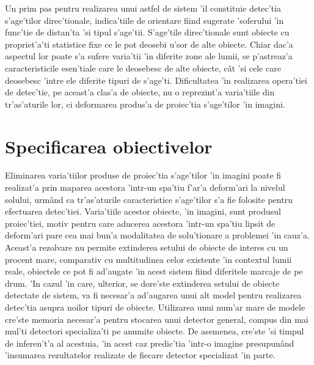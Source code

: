 \documentclass[12pt,a4paper,twoside]{report}
\begin{document}
Un prim pas pentru realizarea unui astfel de sistem 'il constituie detec'tia s'age'tilor direc'tionale, indica'tiile de orientare fiind sugerate 'soferului 'in func'tie de distan'ta 'si tipul s'age'tii. S'age'tile direc'tionale sunt obiecte cu propriet'a'ti statistice fixe ce le pot deosebi u'sor de alte obiecte. Chiar dac'a aspectul lor poate s'a sufere varia'tii 'in diferite zone ale lumii, se p'astreaz'a caracteristicile esen'tiale care le deosebesc de alte obiecte, c\^at 'si cele care deosebesc 'intre ele diferite tipuri de s'age'ti. Dificultatea 'in realizarea opera'tiei de detec'tie, pe aceast'a clas'a de obiecte, nu o reprezint'a varia'tiile din tr'as'aturile lor, ci deformarea produs'a de proiec'tia s'age'tilor 'in imagini. 

\section{Specificarea obiectivelor}
Eliminarea varia'tiilor produse de proiec'tia s'age'tilor 'in imagini poate fi realizat'a prin maparea acestora 'intr-un spa'tiu f'ar'a deform'ari la nivelul solului, urm\^and ca tr'as'aturile caracteristice s'age'tilor s'a fie folosite pentru efectuarea detec'tiei. Varia'tiile acestor obiecte, 'in imagini, sunt produsul proiec'tiei, motiv pentru care aducerea acestora 'intr-un spa'tiu lipsit de deform'ari pare cea mai bun'a modalitatea de solu'tionare a problemei 'in cauz'a. Aceast'a rezolvare nu permite extinderea setului de obiecte de interes cu un procent mare, comparativ cu multitudinea celor existente 'in contextul lumii reale, obiectele ce pot fi ad'augate 'in acest sistem fiind diferitele marcaje de pe drum. 'In cazul 'in care, ulterior, se dore'ste extinderea setului de obiecte detectate de sistem, va fi necesar'a ad'augarea unui alt model pentru realizarea detec'tia asupra noilor tipuri de obiecte. Utilizarea unui num'ar mare de modele cre'ste memoria necesar'a pentru stocarea unui detector general, compus din mai mul'ti detectori specializa'ti pe anumite obiecte. De asemenea, cre'ste 'si timpul de inferen't'a al acestuia, 'in acest caz predic'tia 'intr-o imagine presupun\^and 'insumarea rezultatelor realizate de fiecare detector specializat 'in parte.
\end{document}

